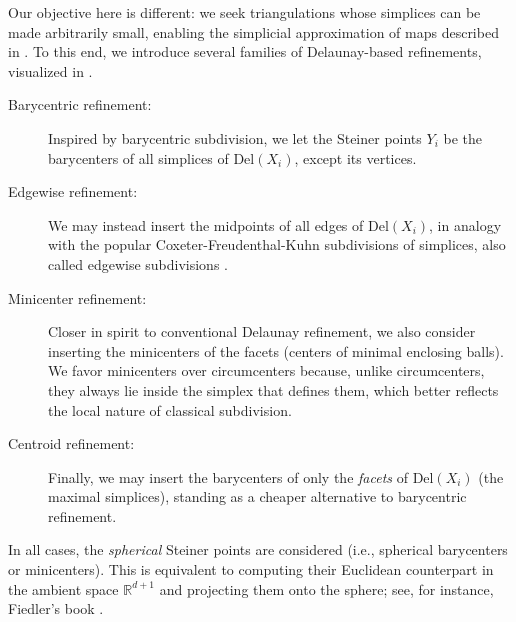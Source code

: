 \documentclass[a4paper,english,cleveref,autoref,thm-restate,nolineno]{socg-lipics-v2021}
\newcommand{\R}{\mathbb R}
\newcommand{\Del}[1] { \mathrm{Del}(#1) } %
\begin{document}
Our objective here is different: we seek triangulations whose simplices can be made arbitrarily small, enabling the simplicial approximation of maps described in .
To this end, we introduce several families of Delaunay-based refinements, visualized in . 
\begin{description}
	\item[Barycentric refinement:]
	Inspired by barycentric subdivision, we let the Steiner points $Y_i$ be the barycenters of all simplices of $\Del{X_i}$, except its vertices.
	
	\item[Edgewise refinement:]
	We may instead insert the midpoints of all edges of $\Del{X_i}$, in analogy with the popular Coxeter-Freudenthal-Kuhn subdivisions of simplices, also called edgewise subdivisions \cite{bey2000simplicial,edelsbrunner2000edgewise,gonccalves2007H2,plaza2007eight,kroger2008stability,korotov2014red,ChoudharyKachanovichWintraecken2020,BoissonnatKachanovichWintraeckenCFKCompact,brunck2023iterated,BoissonnatEtAlSimplicialSubdivisionCurved,boissonnat_et_al:LIPIcs.SoCG.2021.17,boissonnat2023tracing}. 
	
	\item[Minicenter refinement:]
	Closer in spirit to conventional Delaunay refinement, we also consider inserting the minicenters of the facets (centers of minimal enclosing balls).
	We favor minicenters over circumcenters because, unlike circumcenters, they always lie inside the simplex that defines them, which better reflects the local nature of classical subdivision.

	\item[Centroid refinement:]
	Finally, we may insert the barycenters of only the \textit{facets} of $\Del{X_i}$ (the maximal simplices), standing as a cheaper alternative to barycentric refinement.
	
\end{description}
In all cases, the \textit{spherical} Steiner points are considered (i.e., spherical barycenters or minicenters). 
This is equivalent to computing their Euclidean counterpart in the ambient space $\R^{d+1}$ and projecting them onto the sphere; see, for instance, Fiedler's book \cite[Section 5.4]{fiedler2011matrices}.
\end{document}
